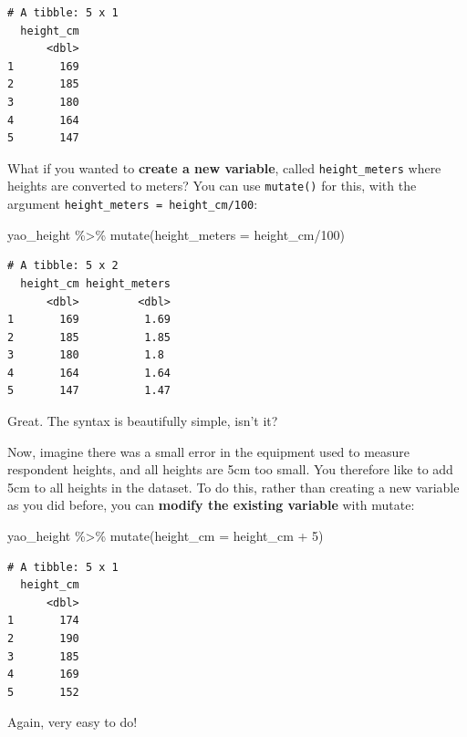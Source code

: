 \documentclass[
  letterpaper,
  DIV=11,
  numbers=noendperiod]{scrreprt}
\newenvironment{Shaded}{\begin{snugshade}}{\end{snugshade}}
\newcommand{\AttributeTok}[1]{\textcolor[rgb]{0.40,0.45,0.13}{#1}}
\newcommand{\DecValTok}[1]{\textcolor[rgb]{0.68,0.00,0.00}{#1}}
\newcommand{\FunctionTok}[1]{\textcolor[rgb]{0.28,0.35,0.67}{#1}}
\newcommand{\NormalTok}[1]{\textcolor[rgb]{0.00,0.23,0.31}{#1}}
\newcommand{\SpecialCharTok}[1]{\textcolor[rgb]{0.37,0.37,0.37}{#1}}
\begin{document}
\begin{verbatim}
# A tibble: 5 x 1
  height_cm
      <dbl>
1       169
2       185
3       180
4       164
5       147
\end{verbatim}

What if you wanted to \textbf{create a new variable}, called
\texttt{height\_meters} where heights are converted to meters? You can
use \texttt{mutate()} for this, with the argument
\texttt{height\_meters\ =\ height\_cm/100}:

\begin{Shaded}
\begin{Highlighting}[]
\NormalTok{yao\_height }\SpecialCharTok{\%\textgreater{}\%} 
  \FunctionTok{mutate}\NormalTok{(}\AttributeTok{height\_meters =}\NormalTok{ height\_cm}\SpecialCharTok{/}\DecValTok{100}\NormalTok{)}
\end{Highlighting}
\end{Shaded}

\begin{verbatim}
# A tibble: 5 x 2
  height_cm height_meters
      <dbl>         <dbl>
1       169          1.69
2       185          1.85
3       180          1.8 
4       164          1.64
5       147          1.47
\end{verbatim}

Great. The syntax is beautifully simple, isn't it?

Now, imagine there was a small error in the equipment used to measure
respondent heights, and all heights are 5cm too small. You therefore
like to add 5cm to all heights in the dataset. To do this, rather than
creating a new variable as you did before, you can \textbf{modify the
existing variable} with mutate:

\begin{Shaded}
\begin{Highlighting}[]
\NormalTok{yao\_height }\SpecialCharTok{\%\textgreater{}\%} 
  \FunctionTok{mutate}\NormalTok{(}\AttributeTok{height\_cm =}\NormalTok{ height\_cm }\SpecialCharTok{+} \DecValTok{5}\NormalTok{)}
\end{Highlighting}
\end{Shaded}

\begin{verbatim}
# A tibble: 5 x 1
  height_cm
      <dbl>
1       174
2       190
3       185
4       169
5       152
\end{verbatim}

Again, very easy to do!
\end{document}
